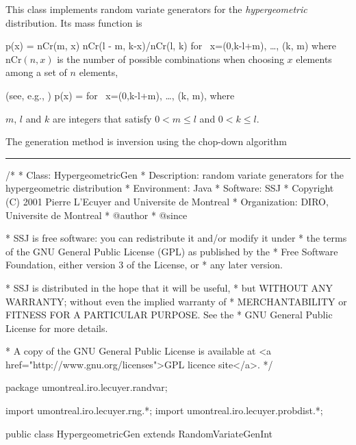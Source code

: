 
This class implements random variate generators for the 
{\em hypergeometric\/} distribution. Its mass function is
\begin{htmlonly}
\eq
    p(x) = 
            \mbox{nCr}(m, x) \mbox{nCr}(l - m, k-x)/\mbox{nCr}(l, k)
            \qquad \mbox {for }
            x=\max(0,k-l+m), \dots, \min(k, m)
\endeq
where nCr$(n,x)$ is the number of possible combinations when choosing
$x$ elements among a set of $n$ elements,
\end{htmlonly}
\begin{latexonly}
(see, e.g., \cite[page 101]{rGEN98a}) 
\eq
    p(x) = 
            \qquad \mbox {for }
            x=\max(0,k-l+m), \dots, \min(k, m),    
\endeq
where
\end{latexonly}
$m$, $l$ and $k$ are integers that satisfy $0< m\le l$ and $0 < k\le l$.

The generation method is inversion using the chop-down algorithm \cite{sKAC85a}

\bigskip\hrule


\begin{code}
\begin{hide}
/*
 * Class:        HypergeometricGen
 * Description:  random variate generators for the hypergeometric distribution
 * Environment:  Java
 * Software:     SSJ 
 * Copyright (C) 2001  Pierre L'Ecuyer and Universite de Montreal
 * Organization: DIRO, Universite de Montreal
 * @author       
 * @since

 * SSJ is free software: you can redistribute it and/or modify it under
 * the terms of the GNU General Public License (GPL) as published by the
 * Free Software Foundation, either version 3 of the License, or
 * any later version.

 * SSJ is distributed in the hope that it will be useful,
 * but WITHOUT ANY WARRANTY; without even the implied warranty of
 * MERCHANTABILITY or FITNESS FOR A PARTICULAR PURPOSE.  See the
 * GNU General Public License for more details.

 * A copy of the GNU General Public License is available at
   <a href="http://www.gnu.org/licenses">GPL licence site</a>.
 */
\end{hide}
package umontreal.iro.lecuyer.randvar;\begin{hide}
import umontreal.iro.lecuyer.rng.*;
import umontreal.iro.lecuyer.probdist.*;
\end{hide}

public class HypergeometricGen extends RandomVariateGenInt \begin{hide} {
   private int m;
   private int l;
   private int k;    
\end{hide}
\end{code}

